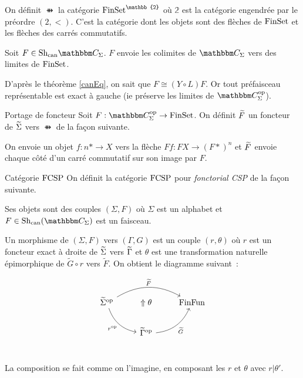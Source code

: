 \begin{defi}{\ffun}
    On définit $\ffun$ la catégorie $\fset^\mathbb{2}$ où $\mathbb{2}$ est la
    catégorie engendrée par le préordre $(2,<)$. C'est la catégorie dont les
    objets sont des flèches de $\text{FinSet}$ et les flèches des carrés commutatifs.
\end{defi}

\begin{lem}
    Soit $F\in\shc{\C_\Sigma}$. $F$ envoie les colimites de $\C_\Sigma$ vers
    des limites de $\text{FinSet}$.
\end{lem}

\begin{pv}
    D'après le théorème \ref{canEq}, on sait que $F\cong (Y\circ L) F$. Or tout préfaisceau
    représentable est exact à gauche (ie préserve les limites de $\C_\Sigma^\op$).
\end{pv}

\begin{defi}{Portage de foncteur}
    Soit $F:\C_\Sigma^\op\rightarrow\fset$. On définit $\widetilde{F}$ un foncteur de
    $\widetilde{\Sigma}$ vers $\ffun$ de la façon suivante.

    On envoie un objet $f:n\ast\rightarrow X$ vers la flèche
    $F f :FX\rightarrow(F\ast)^n$ et $\widetilde{F}$ envoie chaque côté d'un
    carré commutatif sur son image par $F$.
\end{defi}

\begin{defi}{Catégorie $\text{FCSP}$}
    On définit la catégorie $\text{FCSP}$ pour \emph{fonctorial CSP} de la façon suivante.

    Ses objets sont des couples $(\Sigma, F)$ où $\Sigma$ est un alphabet et
    $F\in\shc(\C_\Sigma)$ est un faisceau.

    Un morphisme de $(\Sigma,F)$ vers $(\Gamma,G)$ est un couple $(r,\theta)$ où $r$
    est un foncteur exact à droite de $\widetilde{\Sigma}$ vers $\widetilde{\Gamma}$ et $\theta$ est
    une transformation naturelle épimorphique de $\tilde{G}\circ r$ vers $\tilde{F}$.
    On obtient le diagramme suivant~:

    \[\begin{tikzcd}
        \tsigma^\op\arrow[dr, bend right, swap, "r^\op"]\arrow[rr, bend left, "\tf"]
            & \Uparrow\theta
            & \ffun \\
        & \tgamma^\op\arrow[ur, bend right, swap, "\tg"] \\
    \end{tikzcd}\]

    La composition se fait comme on l'imagine, en composant les $r$ et
    $\theta$ avec $r|\theta'$.
\end{defi}

